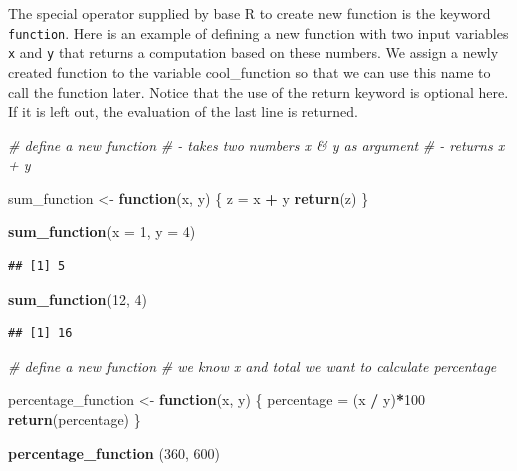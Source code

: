\documentclass[
]{book}
\newenvironment{Shaded}{\begin{snugshade}}{\end{snugshade}}
\newcommand{\AttributeTok}[1]{\textcolor[rgb]{0.13,0.29,0.53}{#1}}
\newcommand{\CommentTok}[1]{\textcolor[rgb]{0.56,0.35,0.01}{\textit{#1}}}
\newcommand{\ControlFlowTok}[1]{\textcolor[rgb]{0.13,0.29,0.53}{\textbf{#1}}}
\newcommand{\DecValTok}[1]{\textcolor[rgb]{0.00,0.00,0.81}{#1}}
\newcommand{\FunctionTok}[1]{\textcolor[rgb]{0.13,0.29,0.53}{\textbf{#1}}}
\newcommand{\NormalTok}[1]{#1}
\newcommand{\OtherTok}[1]{\textcolor[rgb]{0.56,0.35,0.01}{#1}}
\newcommand{\SpecialCharTok}[1]{\textcolor[rgb]{0.81,0.36,0.00}{\textbf{#1}}}
\begin{document}
The special operator supplied by base R to create new function is the keyword \texttt{function}. Here is an example of defining a new function with two input variables \texttt{x} and \texttt{y} that returns a computation based on these numbers. We assign a newly created function to the variable cool\_function so that we can use this name to call the function later. Notice that the use of the return keyword is optional here. If it is left out, the evaluation of the last line is returned.

\begin{Shaded}
\begin{Highlighting}[]
\CommentTok{\# define a new function}
\CommentTok{\# {-} takes two numbers x \& y as argument}
\CommentTok{\# {-} returns x + y}

\NormalTok{sum\_function }\OtherTok{\textless{}{-}} \ControlFlowTok{function}\NormalTok{(x, y) \{}
\NormalTok{  z }\OtherTok{=}\NormalTok{ x }\SpecialCharTok{+}\NormalTok{ y}
  \FunctionTok{return}\NormalTok{(z)}
\NormalTok{\}}

\FunctionTok{sum\_function}\NormalTok{(}\AttributeTok{x =} \DecValTok{1}\NormalTok{, }\AttributeTok{y =} \DecValTok{4}\NormalTok{)}
\end{Highlighting}
\end{Shaded}

\begin{verbatim}
## [1] 5
\end{verbatim}

\begin{Shaded}
\begin{Highlighting}[]
\FunctionTok{sum\_function}\NormalTok{(}\DecValTok{12}\NormalTok{, }\DecValTok{4}\NormalTok{)}
\end{Highlighting}
\end{Shaded}

\begin{verbatim}
## [1] 16
\end{verbatim}

\begin{Shaded}
\begin{Highlighting}[]
\CommentTok{\# define a new function}
\CommentTok{\# we know x and total we want to calculate percentage}

\NormalTok{percentage\_function }\OtherTok{\textless{}{-}} \ControlFlowTok{function}\NormalTok{(x, y) \{}
\NormalTok{  percentage }\OtherTok{=}\NormalTok{ (x }\SpecialCharTok{/}\NormalTok{ y)}\SpecialCharTok{*}\DecValTok{100}
  \FunctionTok{return}\NormalTok{(percentage)}
\NormalTok{\}}

\FunctionTok{percentage\_function}\NormalTok{ (}\DecValTok{360}\NormalTok{, }\DecValTok{600}\NormalTok{)}
\end{Highlighting}
\end{Shaded}
\end{document}
